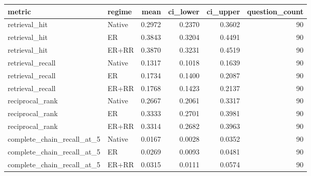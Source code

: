 \begin{tabular}{llrrrr}
\toprule
metric & regime & mean & ci_lower & ci_upper & question_count \\
\midrule
retrieval_hit & Native & 0.2972 & 0.2370 & 0.3602 & 90 \\
retrieval_hit & ER & 0.3843 & 0.3204 & 0.4491 & 90 \\
retrieval_hit & ER+RR & 0.3870 & 0.3231 & 0.4519 & 90 \\
retrieval_recall & Native & 0.1317 & 0.1018 & 0.1639 & 90 \\
retrieval_recall & ER & 0.1734 & 0.1400 & 0.2087 & 90 \\
retrieval_recall & ER+RR & 0.1768 & 0.1423 & 0.2137 & 90 \\
reciprocal_rank & Native & 0.2667 & 0.2061 & 0.3317 & 90 \\
reciprocal_rank & ER & 0.3333 & 0.2701 & 0.3981 & 90 \\
reciprocal_rank & ER+RR & 0.3314 & 0.2682 & 0.3963 & 90 \\
complete_chain_recall_at_5 & Native & 0.0167 & 0.0028 & 0.0352 & 90 \\
complete_chain_recall_at_5 & ER & 0.0269 & 0.0093 & 0.0481 & 90 \\
complete_chain_recall_at_5 & ER+RR & 0.0315 & 0.0111 & 0.0574 & 90 \\
\bottomrule
\end{tabular}
